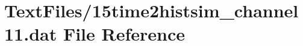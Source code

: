 \hypertarget{15time2histsim__channel11_8dat}{}\section{Text\+Files/15time2histsim\+\_\+channel11.dat File Reference}
\label{15time2histsim__channel11_8dat}
